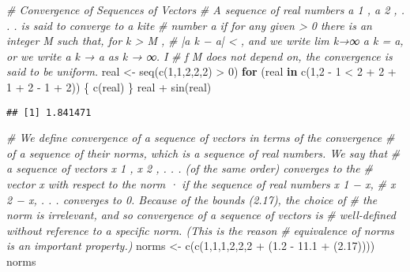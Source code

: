 \documentclass[
]{article}
\newenvironment{Shaded}{\begin{snugshade}}{\end{snugshade}}
\newcommand{\CommentTok}[1]{\textcolor[rgb]{0.56,0.35,0.01}{\textit{#1}}}
\newcommand{\ControlFlowTok}[1]{\textcolor[rgb]{0.13,0.29,0.53}{\textbf{#1}}}
\newcommand{\DecValTok}[1]{\textcolor[rgb]{0.00,0.00,0.81}{#1}}
\newcommand{\FloatTok}[1]{\textcolor[rgb]{0.00,0.00,0.81}{#1}}
\newcommand{\FunctionTok}[1]{\textcolor[rgb]{0.00,0.00,0.00}{#1}}
\newcommand{\NormalTok}[1]{#1}
\newcommand{\OtherTok}[1]{\textcolor[rgb]{0.56,0.35,0.01}{#1}}
\newcommand{\SpecialCharTok}[1]{\textcolor[rgb]{0.00,0.00,0.00}{#1}}
\begin{document}
\begin{Shaded}
\begin{Highlighting}[]
\CommentTok{\# Convergence of Sequences of Vectors}
\CommentTok{\# A sequence of real numbers a 1 , a 2 , . . . is said to converge to a kite }
\CommentTok{\# number a if for any given  \textgreater{} 0 there is an integer M such that, for k \textgreater{} M , }
\CommentTok{\# |a k − a| \textless{} , and we write lim k→∞ a k = a, or we write a k → a as k → ∞. I}
\CommentTok{\# f M does not depend on, the convergence is said to be uniform.}
\NormalTok{real }\OtherTok{\textless{}{-}} \FunctionTok{seq}\NormalTok{(}\FunctionTok{c}\NormalTok{(}\DecValTok{1}\NormalTok{,}\DecValTok{1}\NormalTok{,}\DecValTok{2}\NormalTok{,}\DecValTok{2}\NormalTok{,}\DecValTok{2}\NormalTok{) }\SpecialCharTok{\textgreater{}} \DecValTok{0}\NormalTok{)}
\ControlFlowTok{for}\NormalTok{ (real }\ControlFlowTok{in} \FunctionTok{c}\NormalTok{(}\DecValTok{1}\NormalTok{,}\DecValTok{2} \SpecialCharTok{{-}} \DecValTok{1} \SpecialCharTok{\textless{}} \DecValTok{2} \SpecialCharTok{+} \DecValTok{2} \SpecialCharTok{+} \DecValTok{1} \SpecialCharTok{+} \DecValTok{2} \SpecialCharTok{{-}} \DecValTok{1} \SpecialCharTok{+} \DecValTok{2}\NormalTok{)) \{}
    \FunctionTok{c}\NormalTok{(real)}
\NormalTok{\}}
\NormalTok{real }\SpecialCharTok{+} \FunctionTok{sin}\NormalTok{(real)}
\end{Highlighting}
\end{Shaded}

\begin{verbatim}
## [1] 1.841471
\end{verbatim}

\begin{Shaded}
\begin{Highlighting}[]
\CommentTok{\# We define convergence of a sequence of vectors in terms of the convergence}
\CommentTok{\# of a sequence of their norms, which is a sequence of real numbers. We say that}
\CommentTok{\# a sequence of vectors x 1 , x 2 , . . . (of the same order) converges to the }
\CommentTok{\# vector x with respect to the norm · if the sequence of real numbers x 1 − x, }
\CommentTok{\# x 2 − x, . . . converges to 0. Because of the bounds (2.17), the choice of }
\CommentTok{\# the norm is irrelevant, and so convergence of a sequence of vectors is }
\CommentTok{\# well{-}defined without reference to a specific norm. (This is the reason }
\CommentTok{\# equivalence of norms is an important property.)}
\NormalTok{norms }\OtherTok{\textless{}{-}} \FunctionTok{c}\NormalTok{(}\FunctionTok{c}\NormalTok{(}\DecValTok{1}\NormalTok{,}\DecValTok{1}\NormalTok{,}\DecValTok{1}\NormalTok{,}\DecValTok{2}\NormalTok{,}\DecValTok{2}\NormalTok{,}\DecValTok{2} \SpecialCharTok{+}\NormalTok{ (}\FloatTok{1.2} \SpecialCharTok{{-}} \FloatTok{11.1} \SpecialCharTok{+}\NormalTok{ (}\FloatTok{2.17}\NormalTok{))))}
\NormalTok{norms}
\end{Highlighting}
\end{Shaded}
\end{document}
